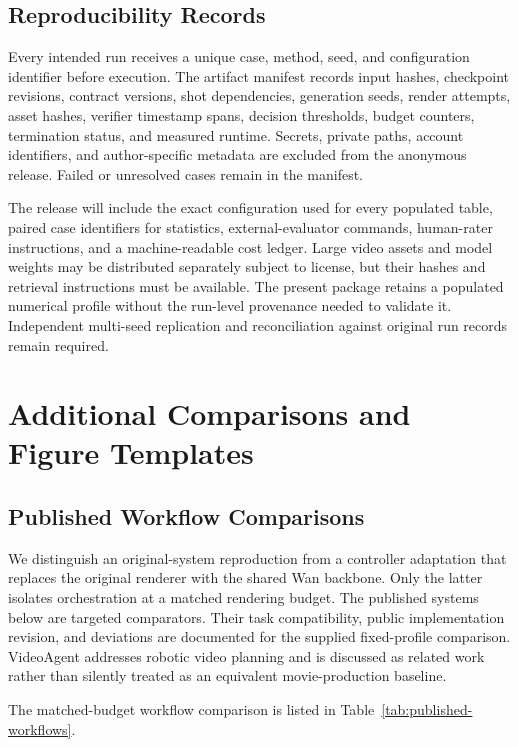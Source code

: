 \subsection{Reproducibility Records}
Every intended run receives a unique case, method, seed, and configuration
identifier before execution. The artifact manifest records input hashes,
checkpoint revisions, contract versions, shot dependencies, generation seeds,
render attempts, asset hashes, verifier timestamp spans, decision thresholds,
budget counters, termination status, and measured runtime. Secrets, private
paths, account identifiers, and author-specific metadata are excluded from the
anonymous release. Failed or unresolved cases remain in the manifest.

The release will include the exact configuration used for every populated
table, paired case identifiers for statistics, external-evaluator commands,
human-rater instructions, and a machine-readable cost ledger. Large video
assets and model weights may be distributed separately subject to license,
but their hashes and retrieval instructions must be available. The present package retains a populated numerical profile without the run-level
provenance needed to validate it. Independent multi-seed replication and
reconciliation against original run records remain required.

\section{Additional Comparisons and Figure Templates}
\label{app:figure-templates}

\subsection{Published Workflow Comparisons}
We distinguish an original-system reproduction from a controller adaptation
that replaces the original renderer with the shared Wan backbone. Only the
latter isolates orchestration at a matched rendering budget. The published
systems below are targeted comparators. Their task compatibility, public
implementation revision, and deviations are documented for the supplied
fixed-profile comparison. VideoAgent addresses robotic
video planning and is discussed as related work rather than silently treated
as an equivalent movie-production baseline.

The matched-budget workflow comparison is listed in Table~\ref{tab:published-workflows}.

